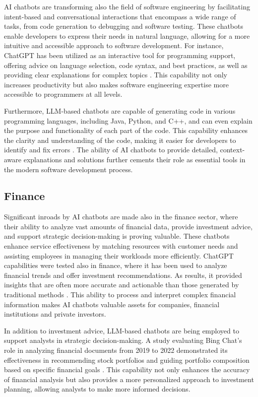 AI chatbots are transforming also the field of software engineering by facilitating intent-based and conversational interactions that encompass a wide range of tasks, from code generation to debugging and software testing. These chatbots enable developers to express their needs in natural language, allowing for a more intuitive and accessible approach to software development. For instance, ChatGPT has been utilized as an interactive tool for programming support, offering advice on language selection, code syntax, and best practices, as well as providing clear explanations for complex topics \cite{meyer2023chatgpt}. This capability not only increases productivity but also makes software engineering expertise more accessible to programmers at all levels.

Furthermore, LLM-based chatbots are capable of generating code in various programming languages, including Java, Python, and C++, and can even explain the purpose and functionality of each part of the code. This capability enhances the clarity and understanding of the code, making it easier for developers to identify and fix errors \cite{dam2024complete}. The ability of AI chatbots to provide detailed, context-aware explanations and solutions further cements their role as essential tools in the modern software development process.

\subsection{Finance}

Significant inroads by AI chatbots are made also in the finance sector, where their ability to analyze vast amounts of financial data, provide investment advice, and support strategic decision-making is proving valuable. These chatbots enhance service effectiveness by matching resources with customer needs and assisting employees in managing their workloads more efficiently. ChatGPT capabilities were tested also in finance, where it has been used to analyze financial trends and offer investment recommendations. As results, it provided insights that are often more accurate and actionable than those generated by traditional methods \cite{dowling2023chatgpt}. This ability to process and interpret complex financial information makes AI chatbots valuable assets for companies, financial institutions and private investors.

In addition to investment advice, LLM-based chatbots are being employed to support analysts in strategic decision-making. A study evaluating Bing Chat's role in analyzing financial documents from 2019 to 2022 demonstrated its effectiveness in recommending stock portfolios and guiding portfolio composition based on specific financial goals \cite{altan2023science}. This capability not only enhances the accuracy of financial analysis but also provides a more personalized approach to investment planning, allowing analysts to make more informed decisions.

